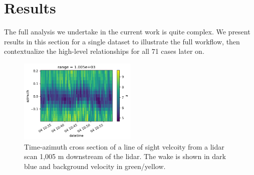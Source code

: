 \documentclass[%
 aip,
 amsmath,
 amssymb,
preprint,%
]{revtex4-2}
\begin{document}




\section{Results} %
\label{sec:Results}

The full analysis we undertake in the current work is quite complex. 
We present results in this section for a single dataset to illustrate the full workflow, then contextualize the high-level relationships for all 71 cases later on. 

\begin{figure}[h]
  \centering
  \includegraphics[width=0.5\textwidth]{figs/lidarX.20230904.103004.png}
  \caption{Time-azimuth cross section of a line of sight velcoity from a lidar scan 1,005 m downstream of the lidar. The wake is shown in dark blue and background velocity in green/yellow. }
  \label{fig:lidarAzTime}
\end{figure}
\end{document}

